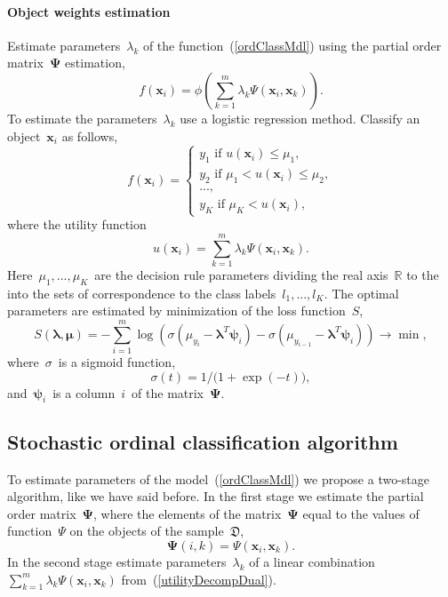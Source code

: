 \documentclass[12pt,preprint]{elsarticle}
\newcommand{\blambda}{\boldsymbol{\lambda}}
\newcommand{\bx}{\mathbf{x}}
\newcommand{\bPsi}{\boldsymbol{\Psi}}
\newcommand{\bpsi}{\boldsymbol{\psi}}
\begin{document}
\paragraph{Object weights estimation}
Estimate parameters~$\lambda_k$ of the function~(\ref{ordClassMdl}) using the partial order matrix~$\bPsi$ estimation,
\[
f(\bx_i) = \phi\left(\sum\limits_{k=1}^m \lambda_{k} \Psi(\bx_i, \bx_k)\right).
\]
To estimate the parameters~$\lambda_k$ use a logistic regression method. Classify an object~$\bx_i$ as follows,
\[
f(\bx_i)=
\begin{cases}
y_1\text{ if } u(\bx_i) \leq \mu_1, \\
y_2\text{ if } \mu_1 < u(\bx_i) \leq \mu_2, \\
..., \\
y_K\text{ if } \mu_K < u(\bx_i),
\end{cases}
\]
where the utility function
\[
u(\bx_i)=\sum\limits_{k=1}^m \lambda_{k} \Psi(\bx_i, \bx_k).
\]
Here~$\mu_1,...,\mu_K$~are the decision rule parameters dividing the real axis~$\mathbb{R}$ to the into the sets of correspondence to the class labels~$l_1,...,l_K$. The optimal parameters are estimated by minimization of the loss function~$S$,
\[
S(\blambda, \boldsymbol{\mu})=-\sum\limits_{i=1}^m \log\left(\sigma(\mu_{y_i}-\blambda^T \bpsi_i) - \sigma(\mu_{y_{i-1}} - \blambda^T \bpsi_i)\right)\rightarrow \min,
\]
where~$\sigma$~is a sigmoid function,
\[
\sigma(t)=1/\bigl(1 + \exp{(-t)}\bigr),
\]
and~$\bpsi_i$~is a column~$i$~of the matrix~$\bPsi$.

\subsection{Stochastic ordinal classification algorithm}

To estimate parameters of the model~(\ref{ordClassMdl}) we propose a two-stage algorithm, like we have said before. In the first stage we estimate the partial order matrix~$\bPsi$, where the elements of the matrix~$\bPsi$ equal to the values of function~$\Psi$ on the objects of the sample~$\mathfrak{D}$,
\[
\bPsi(i,k) = \Psi(\bx_i,\bx_k).
\]
In the second stage estimate parameters~$\lambda_k$ of a linear combination~$\sum\limits_{k=1}^m \lambda_{k} \Psi(\bx_i, \bx_k)$ from~(\ref{utilityDecompDual}).
\end{document}
